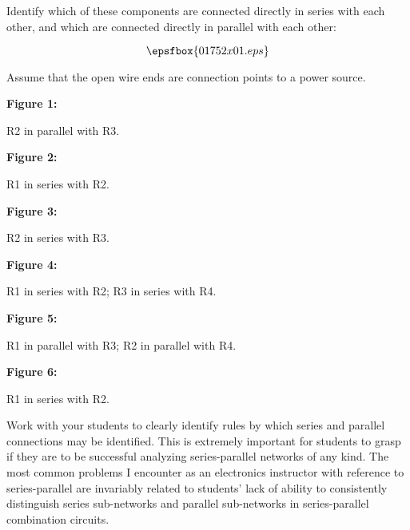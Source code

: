 

Identify which of these components are connected directly in series with each other, and which are connected directly in parallel with each other:

$$\epsfbox{01752x01.eps}$$

Assume that the open wire ends are connection points to a power source.  







\noindent
{\bf Figure 1:}

R2 in parallel with R3.

\vskip 10pt

\noindent
{\bf Figure 2:}

R1 in series with R2.

\vskip 10pt

\noindent
{\bf Figure 3:}

R2 in series with R3.

\vskip 10pt

\noindent
{\bf Figure 4:}

R1 in series with R2; R3 in series with R4.

\vskip 10pt

\noindent
{\bf Figure 5:}

R1 in parallel with R3; R2 in parallel with R4.

\vskip 10pt

\noindent
{\bf Figure 6:}

R1 in series with R2.







Work with your students to clearly identify rules by which series and parallel connections may be identified.  This is extremely important for students to grasp if they are to be successful analyzing series-parallel networks of any kind.  The most common problems I encounter as an electronics instructor with reference to series-parallel are invariably related to students' lack of ability to consistently distinguish series sub-networks and parallel sub-networks in series-parallel combination circuits.




